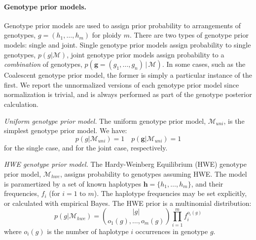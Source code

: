 \documentclass[notitlepage, twocolumn, 10pt]{article}
\begin{document}
\paragraph*{Genotype prior models.} Genotype prior models are used to assign prior probability to arrangements of genotypes, $g = (h_1, \dots, h_m)$ for ploidy $m$. There are two types of genotype prior models: single and joint. Single genotype prior models assign probability to single genotypes, $p(g | \mathcal{M})$, joint genotype prior models assign probability to a \emph{combination} of genotypes, $p(\boldsymbol{g} = (g_1, \dots, g_n) \, | \, \mathcal{M})$. In some cases, such as the Coalescent genotype prior model, the former is simply a particular instance of the first. We report the unnormalized versions of each genotype prior model since normalization is trivial, and is always performed as part of the genotype posterior calculation.

\vspace{3mm}
\noindent\emph{Uniform genotype prior model.} The uniform genotype prior model, $\mathcal{M}_{uni}$, is the simplest genotype prior model. We have:
\begin{equation*}
    p(g | \mathcal{M}_{uni}) = 1 \quad p(\boldsymbol{g} | \mathcal{M}_{uni}) = 1
\end{equation*}
for the single case, and for the joint case, respectively.

\vspace{3mm}
\noindent\emph{HWE genotype prior model.} The Hardy-Weinberg Equilibrium (HWE) genotype prior model, $\mathcal{M}_{hwe}$, assigns probability to genotypes assuming HWE. The model is paramertized by a set of known haplotypes $\boldsymbol{h} = \{h_1, \dots, h_m\}$, and their frequencies, $f_i$ (for $i = 1\text{ to }m$). The haplotype frequencies may be set explicitly, or calculated with empirical Bayes. The HWE prior is a multinomial distribution:
\begin{equation*}
    p(g | \mathcal{M}_{hwe}) = \binom{|g|}{o_1(g), \dots, o_m(g)} \prod_{i=1}^m f_i^{o_i(g)}
\end{equation*}
where $o_i(g)$ is the number of haplotype $i$ occurrences in genotype $g$.
\end{document}
